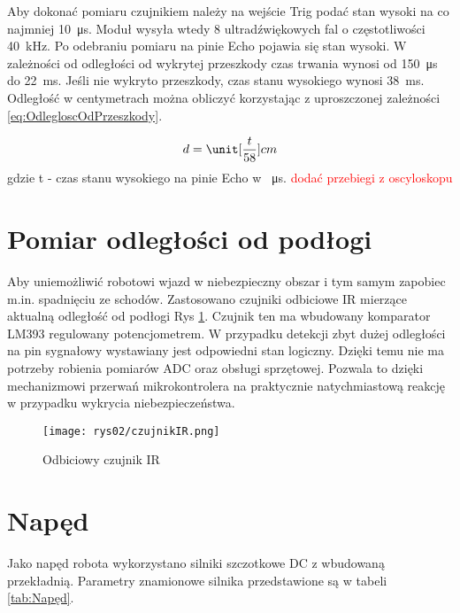 		Aby dokonać pomiaru czujnikiem należy na wejście Trig podać stan wysoki na co najmniej \SI{10}{\micro\second}. Moduł wysyła wtedy 8 ultradźwiękowych fal o częstotliwości \SI{40}{\kilo\hertz}. Po odebraniu pomiaru na pinie Echo pojawia się stan wysoki. W zależności od odległości od wykrytej przeszkody czas trwania wynosi od \SI{150}{\micro\second} do \SI{22}{\milli\second}. Jeśli nie wykryto przeszkody, czas stanu wysokiego wynosi \SI{38}{\milli\second}. Odległość w centymetrach można obliczyć korzystając z uproszczonej zależności \ref{eq:OdlegloscOdPrzeszkody}.
		
		\begin{equation}\label{eq:OdlegloscOdPrzeszkody}
			d = \unit[\frac{t}{58}]{cm}
		\end{equation}
		gdzie t - czas stanu wysokiego na pinie Echo w \SI{}{\micro\second}.	
		\textcolor{red}{dodać przebiegi z oscyloskopu}
	
	\section{Pomiar odległości od podłogi}
		Aby uniemożliwić robotowi wjazd w niebezpieczny obszar i tym samym zapobiec m.in. spadnięciu ze schodów. Zastosowano czujniki odbiciowe IR mierzące aktualną odległość od podłogi Rys \ref{fig:czujnikIR}. Czujnik ten ma wbudowany komparator LM393 regulowany potencjometrem. W przypadku detekcji zbyt dużej odległości na pin sygnałowy wystawiany jest odpowiedni stan logiczny. Dzięki temu nie ma potrzeby robienia pomiarów ADC oraz obsługi sprzętowej. Pozwala to dzięki mechanizmowi przerwań mikrokontrolera na praktycznie natychmiastową reakcję w przypadku wykrycia niebezpieczeństwa. 
		
		\begin{figure}[H]
			\centering
			\texttt{[image: rys02/czujnikIR.png]} 
			\caption{Odbiciowy czujnik IR}
			\label{fig:czujnikIR}
		\end{figure}
	
	\section{Napęd}
		Jako napęd robota wykorzystano silniki szczotkowe DC z wbudowaną przekładnią. Parametry znamionowe silnika przedstawione są w tabeli \ref{tab:Napęd}.
		
